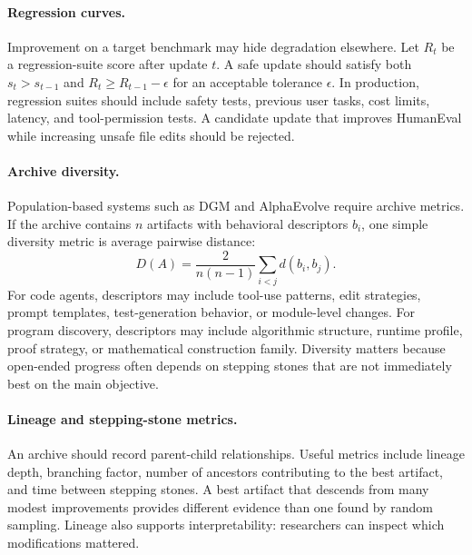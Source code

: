 \paragraph{Regression curves.}
Improvement on a target benchmark may hide degradation elsewhere. Let $R_t$ be a regression-suite score after update $t$. A safe update should satisfy both $s_t > s_{t-1}$ and $R_t \geq R_{t-1}-\epsilon$ for an acceptable tolerance $\epsilon$. In production, regression suites should include safety tests, previous user tasks, cost limits, latency, and tool-permission tests. A candidate update that improves HumanEval while increasing unsafe file edits should be rejected.

\paragraph{Archive diversity.}
Population-based systems such as DGM and AlphaEvolve require archive metrics. If the archive contains $n$ artifacts with behavioral descriptors $b_i$, one simple diversity metric is average pairwise distance:
\begin{equation}
D(A)=\frac{2}{n(n-1)}\sum_{i<j} d(b_i,b_j).
\end{equation}
For code agents, descriptors may include tool-use patterns, edit strategies, prompt templates, test-generation behavior, or module-level changes. For program discovery, descriptors may include algorithmic structure, runtime profile, proof strategy, or mathematical construction family. Diversity matters because open-ended progress often depends on stepping stones that are not immediately best on the main objective.

\paragraph{Lineage and stepping-stone metrics.}
An archive should record parent-child relationships. Useful metrics include lineage depth, branching factor, number of ancestors contributing to the best artifact, and time between stepping stones. A best artifact that descends from many modest improvements provides different evidence than one found by random sampling. Lineage also supports interpretability: researchers can inspect which modifications mattered.


